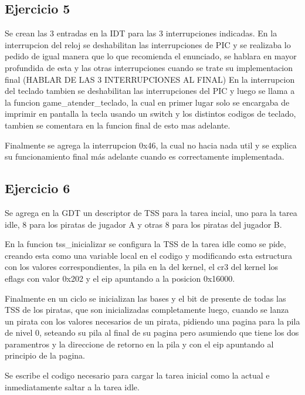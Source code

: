 \subsection{Ejercicio 5}

Se crean las 3 entradas en la IDT para las 3 interrupciones indicadas.
En la interrupcion del reloj se deshabilitan las interrupciones de PIC
y se realizaba lo pedido de igual manera que lo que recomienda el enunciado, se hablara
en mayor profundida de esta y las otras interrupciones cuando se trate su implementacion final                            (HABLAR DE LAS 3 INTERRUPCIONES AL FINAL)
En la interrupcion del teclado tambien se deshabilitan las interrupciones del PIC y luego se llama a
la funcion game_atender_teclado, la cual en primer lugar solo se encargaba de imprimir en pantalla la tecla
usando un switch y los distintos codigos de teclado, tambien se comentara en la funcion final de esto mas adelante.

Finalmente se agrega la interrupcion 0x46, la cual no hacia nada util y se explica su funcionamiento final más
adelante cuando es correctamente implementada.



\subsection{Ejercicio 6}

Se agrega en la GDT un descriptor de TSS para la tarea incial, uno para la tarea idle, 8 para los piratas de jugador A
y otras 8 para los piratas del jugador B.

En la funcion tss_inicializar se configura la TSS de la tarea idle como se pide, creando esta como una variable
local en el codigo y modificando esta estructura con los valores correspondientes, la pila en la del kernel, el
cr3 del kernel los eflags con valor 0x202 y el eip apuntando a la posicion 0x16000.

Finalmente en un ciclo se inicializan las bases y el bit de presente de todas las TSS de los piratas, que son inicializadas
completamente luego, cuando se lanza un pirata con los valores necesarios de un pirata, pidiendo una pagina para la pila
de nivel 0, seteando su pila al final de su pagina pero asumiendo que tiene los dos paramentros y la direccione
de retorno en la pila y con el eip apuntando al principio de la pagina.

Se escribe el codigo necesario para cargar la tarea inicial como la actual e inmediatamente saltar a la tarea idle.

